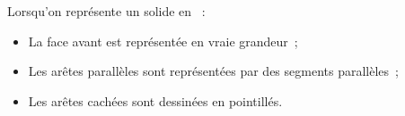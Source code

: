 

\begin{aconnaitre}
Lorsqu'on représente un solide en  :
\begin{itemize}
 \item La face avant est représentée en vraie grandeur ;
 \item Les arêtes parallèles sont représentées par des segments parallèles ;
 \item Les arêtes cachées sont dessinées en pointillés.
 \end{itemize}
\end{aconnaitre}

